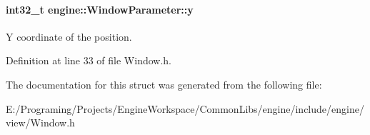 \paragraph[{\texorpdfstring{y}{y}}]{\setlength{\rightskip}{0pt plus 5cm}int32\+\_\+t engine\+::\+Window\+Parameter\+::y}\hypertarget{a00091_a9f6e5adf0cb73c89ebdfe0c993d299fd}{}\label{a00091_a9f6e5adf0cb73c89ebdfe0c993d299fd}
Y coordinate of the position. 

Definition at line 33 of file Window.\+h.



The documentation for this struct was generated from the following file\+:\begin{DoxyCompactItemize}
\item 
E\+:/\+Programing/\+Projects/\+Engine\+Workspace/\+Common\+Libs/engine/include/engine/view/Window.\+h\end{DoxyCompactItemize}
